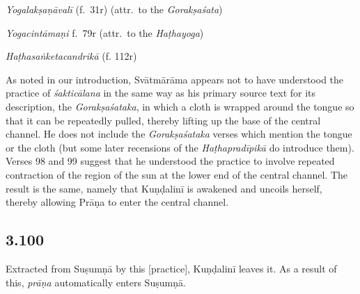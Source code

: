 \begin{ekdosis}
\begin{testimonia}[hp03_099]
\emph{Yogalakṣaṇāvalī} (f.~31r) (attr.~to the \emph{Gorakṣaśata})
\begin{versinnote}
\end{versinnote}

\emph{Yogacintāmaṇi} f.~79r (attr.~to the \emph{Haṭhayoga})
\begin{versinnote}
\end{versinnote}

\emph{Haṭhasaṅketacandrikā} (f. 112r)
\begin{versinnote}
\end{versinnote}
\end{testimonia}

\begin{philcomm}[hp03_099]
As noted in our introduction, Svātmārāma appears not to have understood the practice of \emph{śakticālana} in the same way as his primary source text for its description, the \emph{Gorakṣaśataka}, in which a cloth is wrapped around the tongue so that it can be repeatedly pulled, thereby lifting up the base of the central channel. He does not include the \emph{Gorakṣaśataka} verses which mention the tongue or the cloth (but some later recensions of the \emph{Haṭhapradīpikā} do introduce them). Verses 98 and 99 suggest that he understood the practice to involve repeated contraction of the region of the sun at the lower end of the central channel. The result is the same, namely that Kuṇḍalinī is awakened and uncoils herself, thereby allowing Prāṇa to enter the central channel.
\end{philcomm}


\subsection*{3.100}
\begin{translation}[hp03_100]
Extracted from Suṣumṇā by this [practice], Kuṇḍalinī leaves it. As a result of this, \emph{prāṇa} automatically enters Suṣumṇā.
\end{translation}


\end{ekdosis}
